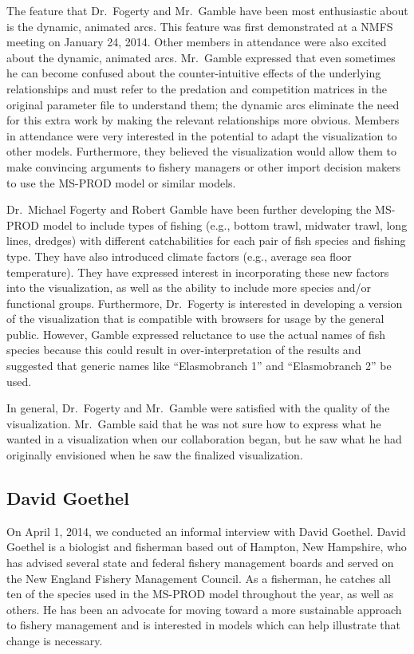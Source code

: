 The feature that Dr.\ Fogerty and Mr.\ Gamble have been most enthusiastic about is the dynamic, animated arcs.  This feature was first demonstrated at a NMFS meeting on January 24, 2014.  Other members in attendance were also excited about the dynamic, animated arcs.  Mr.\ Gamble expressed that even sometimes he can become confused about the counter-intuitive effects of the underlying relationships and must refer to the predation and competition matrices in the original parameter file to understand them; the dynamic arcs eliminate the need for this extra work by making the relevant relationships more obvious.  Members in attendance were very interested in the potential to adapt the visualization to other models.  Furthermore, they believed the visualization would allow them to make convincing arguments to fishery managers or other import decision makers to use the MS-PROD model or similar models.

Dr.\ Michael Fogerty and Robert Gamble have been further developing the MS-PROD model to include types of fishing (e.g., bottom trawl, midwater trawl, long lines, dredges) with different catchabilities for each pair of fish species and fishing type.  They have also introduced climate factors (e.g., average sea floor temperature).  They have expressed interest in incorporating these new factors into the visualization, as well as the ability to include more species and/or functional groups.  Furthermore, Dr.\ Fogerty is interested in developing a version of the visualization that is compatible with browsers for usage by the general public.  However, Gamble expressed reluctance to use the actual names of fish species because this could result in over-interpretation of the results and suggested that generic names like ``Elasmobranch 1'' and ``Elasmobranch 2'' be used.

In general, Dr.\ Fogerty and Mr.\ Gamble were satisfied with the quality of the visualization.  Mr.\ Gamble said that he was not sure how to express what he wanted in a visualization when our collaboration began, but he saw what he had originally envisioned when he saw the finalized visualization.  

\subsection{David Goethel}

On April 1, 2014, we conducted an informal interview with David Goethel.  David Goethel is a biologist and fisherman based out of Hampton, New Hampshire, who has advised several state and federal fishery management boards and served on the New England Fishery Management Council.  As a fisherman, he catches all ten of the species used in the MS-PROD model throughout the year, as well as others.  He has been an advocate for moving toward a more sustainable approach to fishery management and is interested in models which can help illustrate that change is necessary.  

